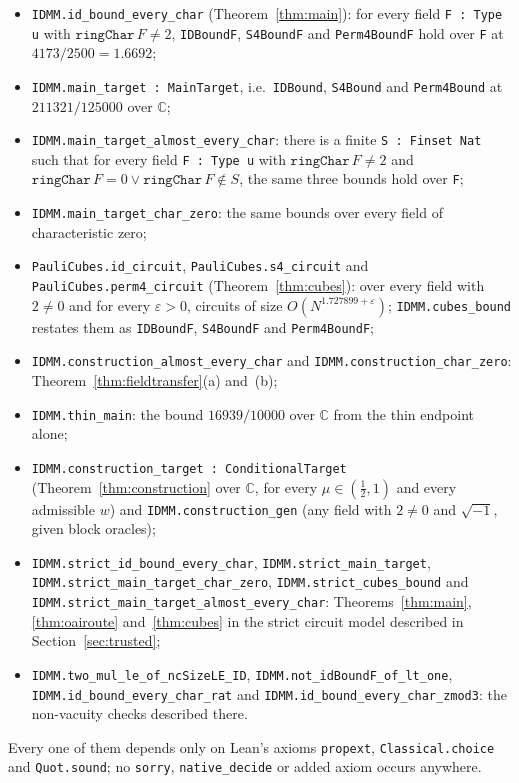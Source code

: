 \documentclass[11pt]{article}
\theoremstyle{definition}
\theoremstyle{remark}
\newcommand{\C}{\mathbb{C}}
\newcommand{\lean}[1]{\texttt{#1}}
\begin{document}
{\sloppy
\begin{itemize}
\item \lean{IDMM.id\_bound\_every\_char} (Theorem~\ref{thm:main}): for every field \lean{F : Type u} with
$\mathtt{ringChar}\,F\ne2$, \lean{IDBoundF}, \lean{S4BoundF} and \lean{Perm4BoundF} hold over \lean{F} at
$4173/2500=1.6692$;
\item \lean{IDMM.main\_target : MainTarget}, i.e.\ \lean{IDBound}, \lean{S4Bound} and \lean{Perm4Bound} at
$211321/125000$ over $\C$;
\item \lean{IDMM.main\_target\_almost\_every\_char}: there is a finite \lean{S : Finset Nat} such that for
every field \lean{F : Type u} with $\mathtt{ringChar}\,F\ne2$ and $\mathtt{ringChar}\,F=0\lor\mathtt{ringChar}\,F\notin S$, the same three bounds hold
over \lean{F};
\item \lean{IDMM.main\_target\_char\_zero}: the same bounds over every field of characteristic zero;
\item \lean{PauliCubes.id\_circuit}, \lean{PauliCubes.s4\_circuit} and \lean{PauliCubes.perm4\_circuit}
(Theorem~\ref{thm:cubes}): over every field with $2\ne0$ and for every $\varepsilon>0$, circuits of size
$O(N^{1.727899+\varepsilon})$; \lean{IDMM.cubes\_bound} restates them as \lean{IDBoundF}, \lean{S4BoundF} and
\lean{Perm4BoundF};
\item \lean{IDMM.construction\_almost\_every\_char} and \lean{IDMM.construction\_char\_zero}:
Theorem~\ref{thm:fieldtransfer}(a) and~(b);
\item \lean{IDMM.thin\_main}: the bound $16939/10000$ over $\C$ from the thin endpoint alone;
\item \lean{IDMM.construction\_target : ConditionalTarget} (Theorem~\ref{thm:construction} over $\C$, for every
$\mu\in(\frac12,1)$ and every admissible $w$) and \lean{IDMM.construction\_gen} (any field with $2\ne0$ and
$\sqrt{-1}$, given block oracles);
\item \lean{IDMM.strict\_id\_bound\_every\_char}, \lean{IDMM.strict\_main\_target},
\lean{IDMM.strict\_main\_target\_char\_zero}, \lean{IDMM.strict\_cubes\_bound} and
\lean{IDMM.strict\_main\_target\_almost\_every\_char}: Theorems~\ref{thm:main}, \ref{thm:oairoute} and~\ref{thm:cubes} in the strict
circuit model described in Section~\ref{sec:trusted};
\item \lean{IDMM.two\_mul\_le\_of\_ncSizeLE\_ID}, \lean{IDMM.not\_idBoundF\_of\_lt\_one},
\lean{IDMM.id\_bound\_every\_char\_rat} and \lean{IDMM.id\_bound\_every\_char\_zmod3}: the non-vacuity checks
described there.
\end{itemize}
\par}
Every one of them depends only on Lean's axioms \lean{propext}, \lean{Classical.choice} and \lean{Quot.sound}; no
\lean{sorry}, \lean{native\_decide} or added axiom occurs anywhere.
\end{document}

